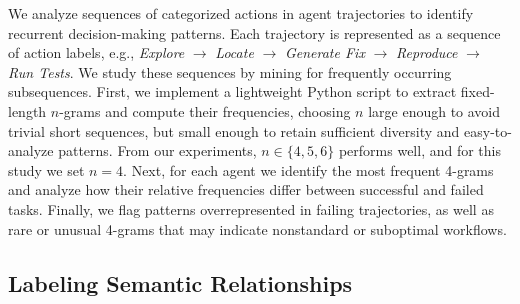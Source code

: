 \documentclass[conference,10pt]{IEEEtran}
\theoremstyle{definition}        %
\begin{document}
We analyze sequences of categorized actions in agent trajectories to identify recurrent decision-making patterns. Each trajectory is represented as a sequence of action labels, e.g., \textit{Explore} \(\rightarrow\) \textit{Locate} \(\rightarrow\) \textit{Generate Fix} \(\rightarrow\) \textit{Reproduce} \(\rightarrow\) \textit{Run Tests}.
We study these sequences by mining for frequently occurring subsequences. First, we implement a lightweight Python script to extract fixed-length $n$-grams and compute their frequencies, choosing $n$ large enough to avoid trivial short sequences, but small enough to retain sufficient diversity and easy-to-analyze patterns. From our experiments, $n \in \{4,5,6\}$ performs well, and for this study we set $n = 4$. Next, for each agent we identify the most frequent 4-grams and analyze how their relative frequencies differ between successful and failed tasks. Finally, we flag patterns overrepresented in failing trajectories, as well as rare or unusual 4-grams that may indicate nonstandard or suboptimal workflows.



\subsection{Labeling Semantic Relationships}
\label{sec:semantic_labeling}
\end{document}
